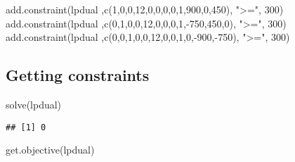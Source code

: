 \documentclass[
]{article}
\newenvironment{Shaded}{\begin{snugshade}}{\end{snugshade}}
\newcommand{\DecValTok}[1]{\textcolor[rgb]{0.00,0.00,0.81}{#1}}
\newcommand{\FunctionTok}[1]{\textcolor[rgb]{0.00,0.00,0.00}{#1}}
\newcommand{\NormalTok}[1]{#1}
\newcommand{\SpecialCharTok}[1]{\textcolor[rgb]{0.00,0.00,0.00}{#1}}
\newcommand{\StringTok}[1]{\textcolor[rgb]{0.31,0.60,0.02}{#1}}
\begin{document}
\begin{Shaded}
\begin{Highlighting}[]
\FunctionTok{add.constraint}\NormalTok{(lpdual ,}\FunctionTok{c}\NormalTok{(}\DecValTok{1}\NormalTok{,}\DecValTok{0}\NormalTok{,}\DecValTok{0}\NormalTok{,}\DecValTok{12}\NormalTok{,}\DecValTok{0}\NormalTok{,}\DecValTok{0}\NormalTok{,}\DecValTok{0}\NormalTok{,}\DecValTok{0}\NormalTok{,}\DecValTok{1}\NormalTok{,}\DecValTok{900}\NormalTok{,}\DecValTok{0}\NormalTok{,}\DecValTok{450}\NormalTok{), }\StringTok{"\textgreater{}="}\NormalTok{, }\DecValTok{300}\NormalTok{)}
\FunctionTok{add.constraint}\NormalTok{(lpdual ,}\FunctionTok{c}\NormalTok{(}\DecValTok{0}\NormalTok{,}\DecValTok{1}\NormalTok{,}\DecValTok{0}\NormalTok{,}\DecValTok{0}\NormalTok{,}\DecValTok{12}\NormalTok{,}\DecValTok{0}\NormalTok{,}\DecValTok{0}\NormalTok{,}\DecValTok{0}\NormalTok{,}\DecValTok{1}\NormalTok{,}\SpecialCharTok{{-}}\DecValTok{750}\NormalTok{,}\DecValTok{450}\NormalTok{,}\DecValTok{0}\NormalTok{), }\StringTok{"\textgreater{}="}\NormalTok{, }\DecValTok{300}\NormalTok{)}
\FunctionTok{add.constraint}\NormalTok{(lpdual ,}\FunctionTok{c}\NormalTok{(}\DecValTok{0}\NormalTok{,}\DecValTok{0}\NormalTok{,}\DecValTok{1}\NormalTok{,}\DecValTok{0}\NormalTok{,}\DecValTok{0}\NormalTok{,}\DecValTok{12}\NormalTok{,}\DecValTok{0}\NormalTok{,}\DecValTok{0}\NormalTok{,}\DecValTok{1}\NormalTok{,}\DecValTok{0}\NormalTok{,}\SpecialCharTok{{-}}\DecValTok{900}\NormalTok{,}\SpecialCharTok{{-}}\DecValTok{750}\NormalTok{), }\StringTok{"\textgreater{}="}\NormalTok{, }\DecValTok{300}\NormalTok{)}
\end{Highlighting}
\end{Shaded}

\hypertarget{getting-constraints-1}{%
\subsection{Getting constraints}\label{getting-constraints-1}}

\begin{Shaded}
\begin{Highlighting}[]
\FunctionTok{solve}\NormalTok{(lpdual)                     }
\end{Highlighting}
\end{Shaded}

\begin{verbatim}
## [1] 0
\end{verbatim}

\begin{Shaded}
\begin{Highlighting}[]
\FunctionTok{get.objective}\NormalTok{(lpdual)           }
\end{Highlighting}
\end{Shaded}
\end{document}
